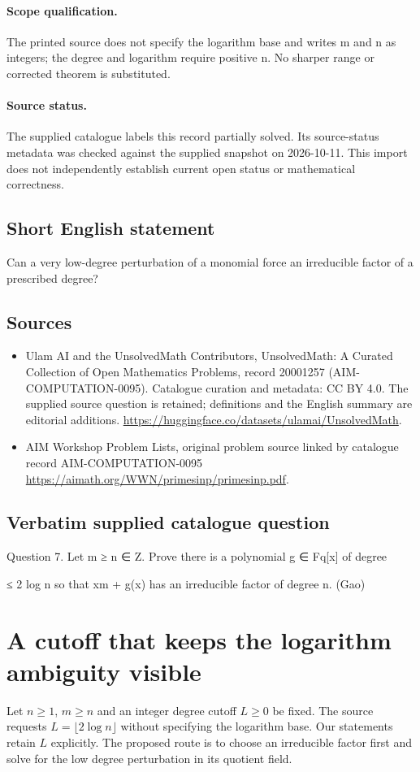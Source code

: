 \documentclass[11pt]{article}
\begin{document}
\paragraph{Scope qualification.}
The printed source does not specify the logarithm base and writes m and n as integers; the degree and logarithm require positive n. No sharper range or corrected theorem is substituted.
\paragraph{Source status.}
The supplied catalogue labels this record partially solved. Its source-status metadata was checked against the supplied snapshot on 2026-10-11. This import does not independently establish current open status or mathematical correctness.
\subsection{Short English statement}
Can a very low-degree perturbation of a monomial force an irreducible factor of a prescribed degree?
\subsection{Sources}
\begin{itemize}
\item[S1] Ulam AI and the UnsolvedMath Contributors, UnsolvedMath: A Curated Collection of Open Mathematics Problems, record 20001257 (AIM-COMPUTATION-0095). Catalogue curation and metadata: CC BY 4.0. The supplied source question is retained; definitions and the English summary are editorial additions.
\url{https://huggingface.co/datasets/ulamai/UnsolvedMath}.
\item[S2] AIM Workshop Problem Lists, original problem source linked by catalogue record AIM-COMPUTATION-0095
\url{https://aimath.org/WWN/primesinp/primesinp.pdf}.
\end{itemize}
\subsection{Verbatim supplied catalogue question}
Question 7. Let m ≥ n ∈ Z. Prove there is a polynomial g ∈ Fq[x] of degree

≤ 2 log n so that xm + g(x) has an irreducible factor of degree n. (Gao)

\section{A cutoff that keeps the logarithm ambiguity visible}
Let $n\ge1$, $m\ge n$ and an integer degree cutoff $L\ge0$ be fixed.
The source requests $L=\lfloor2\log n\rfloor$ without specifying the
logarithm base. Our statements retain $L$ explicitly. The proposed
route is to choose an irreducible factor first and solve for the low
degree perturbation in its quotient field.
\end{document}
